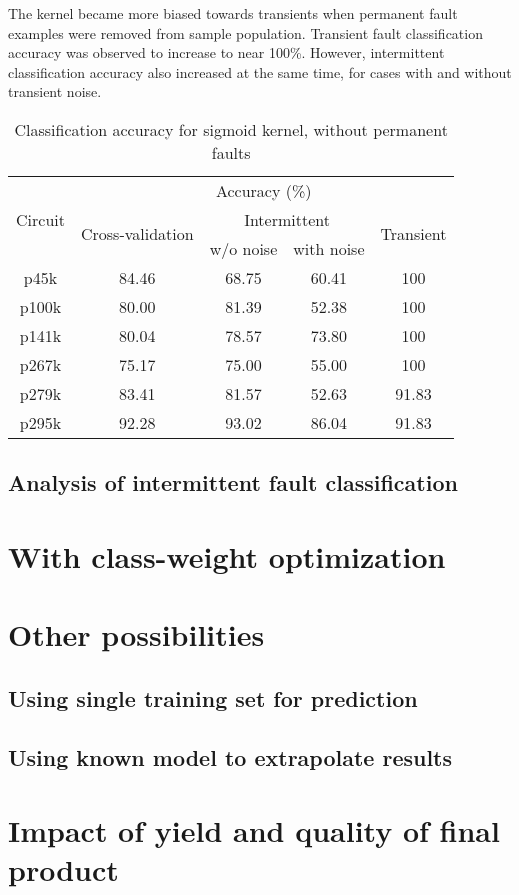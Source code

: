 The kernel became more biased towards transients when permanent fault examples were removed from sample population. Transient fault classification accuracy was observed to increase to near 100\%. However, intermittent classification accuracy also increased at the same time, for cases with and without transient noise.

\begin{table}[h]

	\captionsetup{justification=centering}
\begin{tabular}{ccccc}
\hline
\multirow{3}{*}{Circuit} & \multicolumn{4}{c}{Accuracy (\%)}                                                                 \\ \cline{2-5} 
                         & \multirow{2}{*}{Cross-validation} & \multicolumn{2}{c}{Intermittent} & \multirow{2}{*}{Transient} \\ \cline{3-4}
                         &                                   & w/o noise      & with noise      &                            \\ \hline
p45k                     & 84.46                             & 68.75          & 60.41           & 100                        \\
p100k                    & 80.00                             & 81.39          & 52.38           & 100                        \\
p141k                    & 80.04                             & 78.57          & 73.80           & 100                        \\
p267k                    & 75.17                             & 75.00          & 55.00           & 100                        \\
p279k                    & 83.41                             & 81.57          & 52.63           & 91.83                      \\
p295k                    & 92.28                             & 93.02          & 86.04           & 91.83                     \\
\hline
\end{tabular}
\caption {Classification accuracy for sigmoid kernel, without permanent faults}
\label{tab:sigwop}
\end{table}

\subsection{Analysis of intermittent fault classification}
\section{With class-weight optimization}
\section{Other possibilities}
\subsection{Using single training set for prediction}
\subsection{Using known model to extrapolate results}
\section{Impact of yield and quality of final product}
